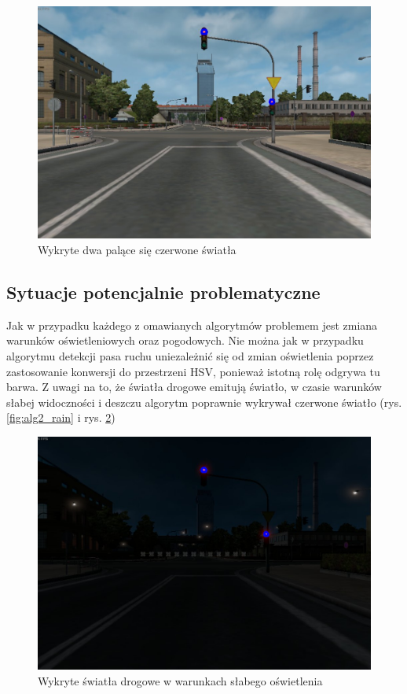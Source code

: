 \begin{figure}
  \centering
  \includegraphics[width=13cm]{img/alg2_res.jpg}
  \caption{Wykryte dwa palące się czerwone światła}
  \label{fig:alg2_res}
\end{figure}

\subsection{Sytuacje potencjalnie problematyczne}
Jak w przypadku każdego z omawianych algorytmów problemem jest zmiana warunków oświetleniowych oraz pogodowych. Nie można jak w przypadku algorytmu detekcji pasa ruchu uniezależnić się od zmian oświetlenia poprzez zastosowanie konwersji do przestrzeni HSV, ponieważ istotną rolę odgrywa tu barwa. Z uwagi na to, że światła drogowe emitują światło, w czasie warunków słabej widoczności i deszczu algorytm poprawnie wykrywał czerwone światło (rys. \ref{fig:alg2_rain} i rys. \ref{fig:alg2_late})

\begin{figure}
  \centering
  \includegraphics[width=13cm]{img/alg2_late.jpg}
  \caption{Wykryte światła drogowe w warunkach słabego oświetlenia}
  \label{fig:alg2_late}
\end{figure}

